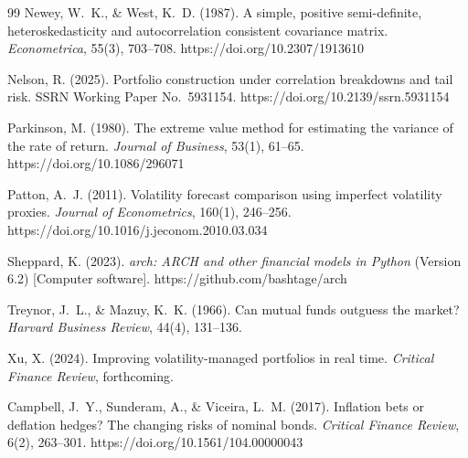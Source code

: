\documentclass[12pt,a4paper]{article}
\begin{document}
\begin{thebibliography}{99}
Newey, W.~K., \& West, K.~D. (1987). A simple, positive semi-definite, heteroskedasticity and autocorrelation consistent covariance matrix. \textit{Econometrica}, 55(3), 703--708. https://doi.org/10.2307/1913610

Nelson, R. (2025). Portfolio construction under correlation breakdowns and tail risk. SSRN Working Paper No.~5931154. https://doi.org/10.2139/ssrn.5931154

Parkinson, M. (1980). The extreme value method for estimating the variance of the rate of return. \textit{Journal of Business}, 53(1), 61--65. https://doi.org/10.1086/296071

Patton, A.~J. (2011). Volatility forecast comparison using imperfect volatility proxies. \textit{Journal of Econometrics}, 160(1), 246--256. https://doi.org/10.1016/j.jeconom.2010.03.034

Sheppard, K. (2023). \textit{arch: ARCH and other financial models in Python} (Version 6.2) [Computer software]. https://github.com/bashtage/arch

Treynor, J.~L., \& Mazuy, K.~K. (1966). Can mutual funds outguess the market? \textit{Harvard Business Review}, 44(4), 131--136.

Xu, X. (2024). Improving volatility-managed portfolios in real time. \textit{Critical Finance Review}, forthcoming.

Campbell, J.~Y., Sunderam, A., \& Viceira, L.~M. (2017). Inflation bets or deflation hedges? The changing risks of nominal bonds. \textit{Critical Finance Review}, 6(2), 263--301. https://doi.org/10.1561/104.00000043

\end{thebibliography}
\endgroup
\end{document}
